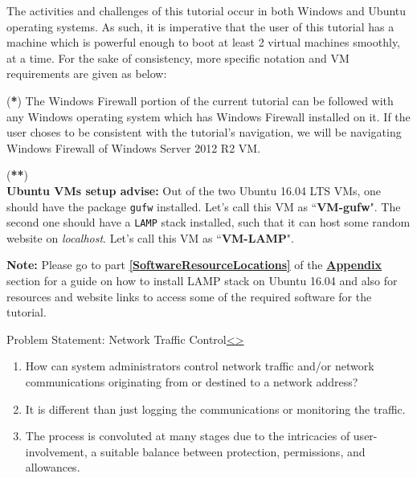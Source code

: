 \documentclass[12pt]{extarticle}
\newenvironment{instructionblock}{\Large\bgroup}{\egroup}
\newcommand{\ben}{\begin{enumerate}}
\newcommand{\een}{\end{enumerate}}
\begin{document}
\vspace{4mm}
\noindent
The activities and challenges of this tutorial occur in both Windows and Ubuntu operating systems. As such, it is imperative that the user of this tutorial has a machine which is powerful enough to boot at least 2 virtual machines smoothly, at a time. For the sake of consistency, more specific notation and VM requirements are given as below:


\vspace{4mm}
\noindent
(\textbf{*}) The Windows Firewall portion of the current tutorial can be followed with any Windows operating system which has Windows Firewall installed on it. If the user choses to be consistent with the tutorial's navigation, we will be navigating Windows Firewall of Windows Server 2012 R2 VM.  

\vspace{6mm}
\noindent
\label{UbuntuSetup}
(\textbf{**})\\
\textbf{Ubuntu VMs setup advise:} Out of the two Ubuntu 16.04 LTS VMs, one should have the package \texttt{gufw} installed. Let's call this VM as ``\textbf{VM-gufw}". The second one should have a \texttt{LAMP} stack installed, such that it can host some random website on \textit{localhost}. Let's call this VM as ``\textbf{VM-LAMP}".  

\vspace{6mm}
\noindent
\textbf{Note:} Please go to part \textbf{\underline{\ref{SoftwareResourceLocations}}} of the {\textbf{\hyperref[slide 24]{\underline{Appendix}}}} section for a guide on how to install LAMP stack on Ubuntu 16.04 and also for resources and website links to access some of the required software for the tutorial.  





\pagebreak
\begin{slide}{Problem Statement: Network Traffic Control}{\hyperref[slide 3]{\textless}\hyperref[slide 5]{\textgreater}}
	\begin{instructionblock}
		\ben
			\item { How can system administrators control network traffic and/or network communications originating from or destined to a network address? }
			\item { It is different than just logging the communications or monitoring the traffic. }
			\item { The process is convoluted at many stages due to the intricacies of user-involvement, a suitable balance between protection, permissions, and allowances. }
		\een
	\end{instructionblock}
\end{slide}
\end{document}
